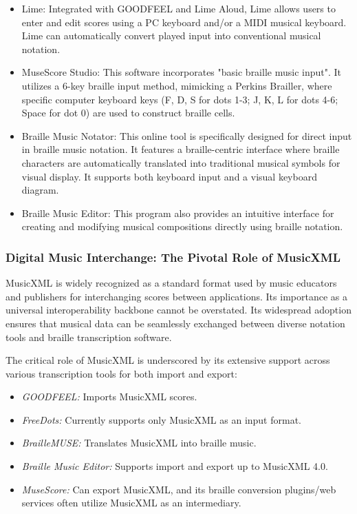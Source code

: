 \begin{itemize}
    \item Lime: Integrated with GOODFEEL and Lime Aloud, Lime allows users to enter and edit scores using a PC keyboard and/or a MIDI musical keyboard. Lime can automatically convert played input into conventional musical notation. \cite{dancingdots-goodfeel, canasstech-limealoud, dancingdots-lime}
    \item MuseScore Studio: This software incorporates "basic braille music input". \cite{soundwithoutsight-musescore} It utilizes a 6-key braille input method, mimicking a Perkins Brailler, where specific computer keyboard keys (F, D, S for dots 1-3; J, K, L for dots 4-6; Space for dot 0) are used to construct braille cells. \cite{musescore-braille}
    \item Braille Music Notator: This online tool is specifically designed for direct input in braille music notation. It features a braille-centric interface where braille characters are automatically translated into traditional musical symbols for visual display. It supports both keyboard input and a visual keyboard diagram. \cite{pathstoliteracy-notator, braillemusicnotator}
    \item Braille Music Editor: This program also provides an intuitive interface for creating and modifying musical compositions directly using braille notation. \cite{braillemusiceditor}
\end{itemize}

\subsubsection{Digital Music Interchange: The Pivotal Role of MusicXML}
MusicXML is widely recognized as a standard format used by music educators and publishers for interchanging scores between applications. \cite{dancingdots-goodfeel} Its importance as a universal interoperability backbone cannot be overstated. Its widespread adoption ensures that musical data can be seamlessly exchanged between diverse notation tools and braille transcription software.

The critical role of MusicXML is underscored by its extensive support across various transcription tools for both import and export:
\begin{itemize}
    \item \emph{GOODFEEL:} Imports MusicXML scores. \cite{dancingdots-goodfeel}
    \item \emph{FreeDots:} Currently supports only MusicXML as an input format. \cite{blindguru-freedots}
    \item \emph{BrailleMUSE:} Translates MusicXML into braille music. \cite{braillemuse}
    \item \emph{Braille Music Editor:} Supports import and export up to MusicXML 4.0. \cite{braillemusiceditor}
    \item \emph{MuseScore:} Can export MusicXML, and its braille conversion plugins/web services often utilize MusicXML as an intermediary. \cite{musescore-accessibility}
\end{itemize}

